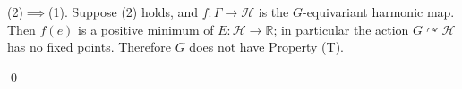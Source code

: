 \documentclass[12pt]{amsart}
\numberwithin{equation}{section}
\theoremstyle{plain}
\theoremstyle{remark}
\theoremstyle{definition}
\newcommand{\ra}{\rightarrow}
\newcommand{\h}{{\mathcal H}}
\newcommand{\R}{\mathbb R}
\newcommand{\acts}{\curvearrowright}
\def\Ga{\Gamma}
\def\ra{\rightarrow}
\begin{document}
\bigskip
(2)$\implies$(1).  Suppose (2) holds, and $f:\Ga\ra\h$
is the $G$-equivariant harmonic map.  Then 
 $f(e)$ is a positive minimum of $E:\h\ra\R$;
in particular the action $G\acts\h$
has no fixed points.  Therefore $G$ does not have 
Property (T). 

\qed










\end{document}
